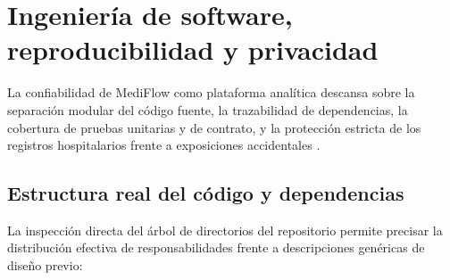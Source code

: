 
\section{Ingeniería de software, reproducibilidad y privacidad}

La confiabilidad de MediFlow como plataforma analítica descansa sobre la separación modular del código fuente, la trazabilidad de dependencias, la cobertura de pruebas unitarias y de contrato, y la protección estricta de los registros hospitalarios frente a exposiciones accidentales \parencite{mediflow2026informe,mediflow2026auditoria}.

\subsection{Estructura real del código y dependencias}

La inspección directa del árbol de directorios del repositorio permite precisar la distribución efectiva de responsabilidades frente a descripciones genéricas de diseño previo:

